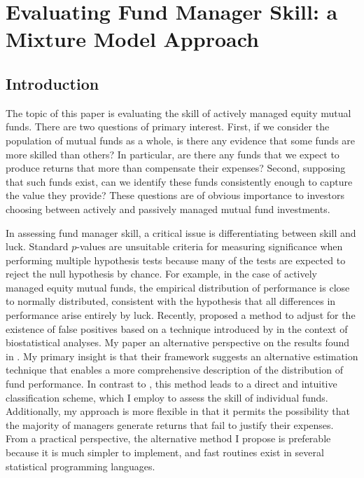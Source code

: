 \chapter{Evaluating Fund Manager Skill: a Mixture Model Approach}
\label{chapter:two}

\section{Introduction}
\label{sec:introduction}

The topic of this paper is evaluating the skill of actively managed equity mutual funds.  There are two questions of primary interest.  First, if we consider the population of mutual funds as a whole, is there any evidence that some funds are more skilled than others?  In particular, are there any funds that we expect to produce returns that more than compensate their expenses?  Second, supposing that such funds exist, can we identify these funds consistently enough to capture the value they provide?  These questions are of obvious importance to investors choosing between actively and passively managed mutual fund investments.

In assessing fund manager skill, a critical issue is differentiating between skill and luck. Standard $p$-values are unsuitable criteria for measuring significance when performing multiple hypothesis tests because many of the tests are expected to reject the null hypothesis by chance.  For example, in the case of actively managed equity mutual funds, the empirical distribution of performance is close to normally distributed, consistent with the hypothesis that all differences in performance arise entirely by luck. Recently, \citet{Barras2010} proposed a method to adjust for the existence of false positives based on a technique introduced by \citet{Storey2002} in the context of biostatistical analyses. My paper an alternative perspective on the results found in \citet{Barras2010}. My primary insight is that their framework suggests an alternative estimation technique that enables a more comprehensive description of the distribution of fund performance. In contrast to \citet{Barras2010}, this method leads to a direct and intuitive classification scheme, which I employ to assess the skill of individual funds.  Additionally, my approach is more flexible in that it permits the possibility that the majority of managers generate returns that fail to justify their expenses. From a practical perspective, the alternative method I propose is preferable because it is much simpler to implement, and fast routines exist in several statistical programming languages.

